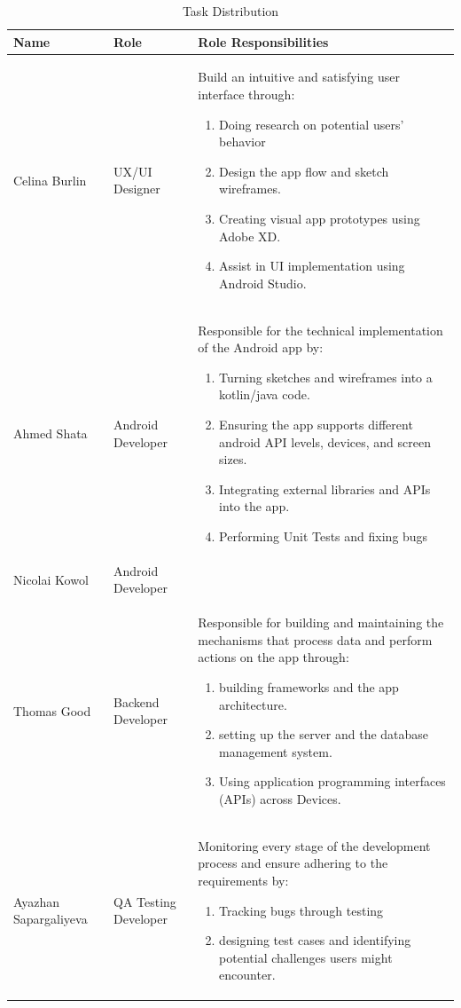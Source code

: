 \documentclass[conference]{IEEEtran}
\begin{document}
\begin{table}
\caption{Task Distribution}
\centering
\def\arraystretch{1.2} 
\begin{tabular}{|p{1.8cm}|p{1.4cm}|p{4.4cm}|}
\hline
Name & Role & Role Responsibilities\\ \hline
Celina Burlin & UX/UI Designer & Build an intuitive and satisfying user interface through: 
\begin{enumerate}
    \item Doing research on potential users’ behavior 
    \item Design the app flow and sketch wireframes.
    \item Creating visual app prototypes using Adobe XD. 
    \item Assist in UI implementation using Android Studio.
\end{enumerate} \\ \hline
Ahmed Shata & Android Developer  & Responsible for the technical implementation of the Android app by:
\begin{enumerate}
    \item Turning sketches and wireframes into a kotlin/java code.
    \item Ensuring the app supports different android API levels, devices, and screen sizes.
    \item Integrating external libraries and APIs into the app. 
    \item Performing Unit Tests and fixing bugs
\end{enumerate}
\\  \hhline{--~}
Nicolai Kowol \vspace{25px} & Android Developer  &                   \\ \hline
Thomas Good & Backend Developer  & Responsible for building and maintaining the mechanisms that process data and perform actions on the app through:
\begin{enumerate}
    \item building frameworks and the app architecture.
    \item setting up the server and the database management system.
    \item Using application programming interfaces (APIs) across Devices.
\end{enumerate}
\\ \hline
Ayazhan Sapargaliyeva & QA Testing Developer  & Monitoring every stage of the development process and ensure adhering to the requirements by:
\begin{enumerate}
    \item Tracking bugs through testing
    \item designing test cases and identifying potential challenges users might encounter.
\end{enumerate}

\end{tabular}\hline
\end{table}
\end{document}
